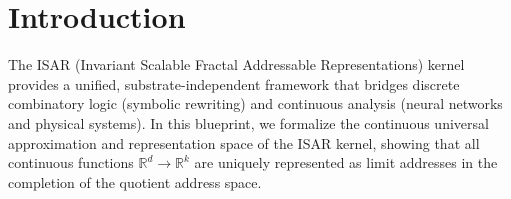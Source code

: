 \chapter{Introduction}

The ISAR (Invariant Scalable Fractal Addressable Representations) kernel provides a unified, substrate-independent framework that bridges discrete combinatory logic (symbolic rewriting) and continuous analysis (neural networks and physical systems). In this blueprint, we formalize the continuous universal approximation and representation space of the ISAR kernel, showing that all continuous functions $\mathbb{R}^d \to \mathbb{R}^k$ are uniquely represented as limit addresses in the completion of the quotient address space.